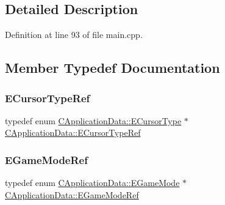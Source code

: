 \subsection{Detailed Description}


Definition at line 93 of file main.\+cpp.



\subsection{Member Typedef Documentation}
\hypertarget{classCApplicationData_acaef079bdad1f957a327d36fa6ee8c81}{}\label{classCApplicationData_acaef079bdad1f957a327d36fa6ee8c81} 
\subsubsection{\texorpdfstring{E\+Cursor\+Type\+Ref}{ECursorTypeRef}}
{\footnotesize\ttfamily typedef  enum \hyperlink{classCApplicationData_ad024b66b60017c45c47a85dbc636ae69}{C\+Application\+Data\+::\+E\+Cursor\+Type} $\ast$ \hyperlink{classCApplicationData_acaef079bdad1f957a327d36fa6ee8c81}{C\+Application\+Data\+::\+E\+Cursor\+Type\+Ref}\hspace{0.3cm}{\ttfamily [protected]}}

\hypertarget{classCApplicationData_ab56fe2209f0f43e42eef3fb09cf64029}{}\label{classCApplicationData_ab56fe2209f0f43e42eef3fb09cf64029} 
\subsubsection{\texorpdfstring{E\+Game\+Mode\+Ref}{EGameModeRef}}
{\footnotesize\ttfamily typedef  enum \hyperlink{classCApplicationData_ac8ac37a4c8bb871036fbbdc6a072e403}{C\+Application\+Data\+::\+E\+Game\+Mode} $\ast$ \hyperlink{classCApplicationData_ab56fe2209f0f43e42eef3fb09cf64029}{C\+Application\+Data\+::\+E\+Game\+Mode\+Ref}\hspace{0.3cm}{\ttfamily [protected]}}

\hypertarget{classCApplicationData_acfb51c61ccc20a0cd5daa02973ab0870}{}\label{classCApplicationData_acfb51c61ccc20a0cd5daa02973ab0870} 
